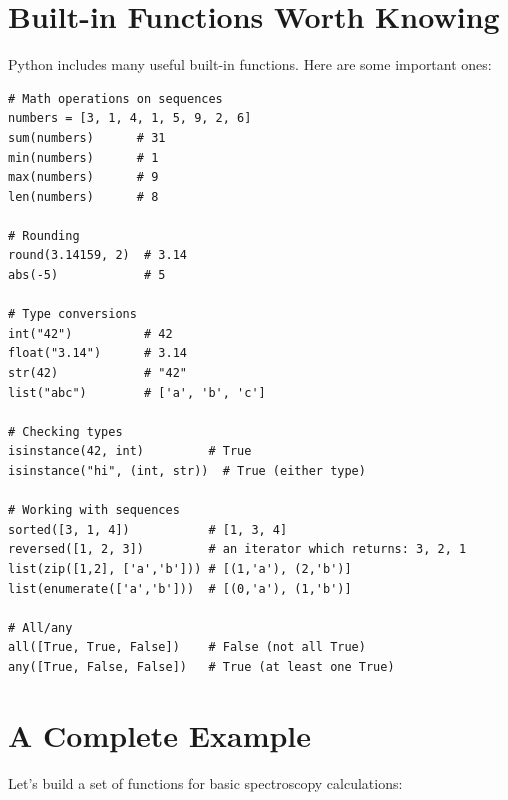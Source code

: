 \section{Built-in Functions Worth Knowing}
\label{sec:builtin-functions}

Python includes many useful built-in functions. Here are some important ones:

\begin{lstlisting}
# Math operations on sequences
numbers = [3, 1, 4, 1, 5, 9, 2, 6]
sum(numbers)      # 31
min(numbers)      # 1
max(numbers)      # 9
len(numbers)      # 8

# Rounding
round(3.14159, 2)  # 3.14
abs(-5)            # 5

# Type conversions
int("42")          # 42
float("3.14")      # 3.14
str(42)            # "42"
list("abc")        # ['a', 'b', 'c']

# Checking types
isinstance(42, int)         # True
isinstance("hi", (int, str))  # True (either type)

# Working with sequences
sorted([3, 1, 4])           # [1, 3, 4]
reversed([1, 2, 3])         # an iterator which returns: 3, 2, 1
list(zip([1,2], ['a','b'])) # [(1,'a'), (2,'b')]
list(enumerate(['a','b']))  # [(0,'a'), (1,'b')]

# All/any
all([True, True, False])    # False (not all True)
any([True, False, False])   # True (at least one True)
\end{lstlisting}

\section{A Complete Example}
\label{sec:function-example}

Let's build a set of functions for basic spectroscopy calculations:

